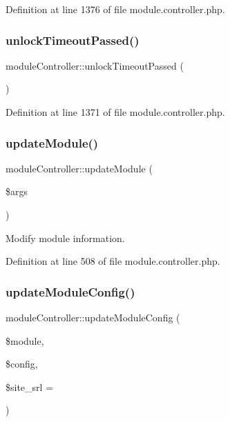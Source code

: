 Definition at line 1376 of file module.\+controller.\+php.

\mbox{\label{classmoduleController_aac97ab294279631cb3cf1078063e8b56}} 
\subsubsection{\texorpdfstring{unlock\+Timeout\+Passed()}{unlockTimeoutPassed()}}
{\footnotesize\ttfamily module\+Controller\+::unlock\+Timeout\+Passed (\begin{DoxyParamCaption}{ }\end{DoxyParamCaption})}



Definition at line 1371 of file module.\+controller.\+php.

\mbox{\label{classmoduleController_ae4a1e785f41aa56a626b7f72346bbe0c}} 
\subsubsection{\texorpdfstring{update\+Module()}{updateModule()}}
{\footnotesize\ttfamily module\+Controller\+::update\+Module (\begin{DoxyParamCaption}\item[{}]{\$args }\end{DoxyParamCaption})}



Modify module information. 



Definition at line 508 of file module.\+controller.\+php.

\mbox{\label{classmoduleController_aa6d6239d1fd7c1f64f7061778ad4127b}} 
\subsubsection{\texorpdfstring{update\+Module\+Config()}{updateModuleConfig()}}
{\footnotesize\ttfamily module\+Controller\+::update\+Module\+Config (\begin{DoxyParamCaption}\item[{}]{\$module,  }\item[{}]{\$config,  }\item[{}]{\$site\+\_\+srl = {} }\end{DoxyParamCaption})}



